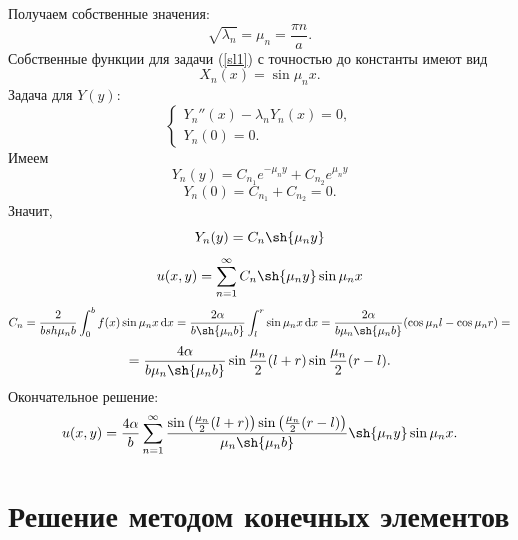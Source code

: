 \documentclass{report}
\begin{document}
Получаем собственные значения:
\begin{equation*}
	\sqrt{\lambda_n}=\mu_n=\frac{\pi n}{a} .
\end{equation*}
Собственные функции для задачи (\ref{sl1}) с точностью до константы имеют вид
\begin{equation*}
	X_n(x)=\sin{\mu_n x}.
\end{equation*}
Задача для $Y(y)$:
\begin{equation}\label{sl2}
	\begin{cases}
		Y_n''(x)-\lambda_n Y_n(x)=0,\\
		Y_n(0)=0.
	\end{cases}
\end{equation}
Имеем
\begin{equation}
	Y_n(y)=C_{n_1}e^{-\mu_n  y}+C_{n_2}e^{\mu_n  y}
\end{equation}
\begin{equation*}
	Y_n(0)=C_{n_1} + C_{n_2} = 0.
\end{equation*}
Значит,
\begin{equation}
	Y_n(y)=C_n \sh{\mu_n y}
\end{equation}
\begin{equation}
	u(x,y) = \sum_{n=1}^{\infty}C_n \sh{\mu_n y} \sin{\mu_n x}
\end{equation}
\begin{equation*}
	C_n = \frac{2}{b sh{\mu_n b}}\int_0^b f(x) \sin{\mu_n x} \dd{x} = \frac{2\alpha}{b\sh{\mu_n b}}\int_l^r\sin{\mu_nx}\dd{x} =  \frac{2\alpha}{b\mu_n\sh{\mu_n b}}(\cos{\mu_n l} - \cos{\mu_n r})=
\end{equation*}
\begin{equation}
	=\frac{4\alpha}{b\mu_n\sh{\mu_n b}}\sin{\frac{\mu_n}{2}(l+r)}\sin{\frac{\mu_n}{2}(r-l)}.
\end{equation}
Окончательное решение:
\begin{equation}
	u(x,y)=\frac{4\alpha}{b}\sum_{n=1}^{\infty}\frac{\sin{\left(\frac{\mu_n}{2}(l+r)\right)}\sin{\left(\frac{\mu_n}{2}(r-l)\right)}}{\mu_n\sh{\mu_n b}}\sh{\mu_n y} \sin{\mu_n x}.
\end{equation}

\chapter{Решение методом конечных элементов}
\end{document}
